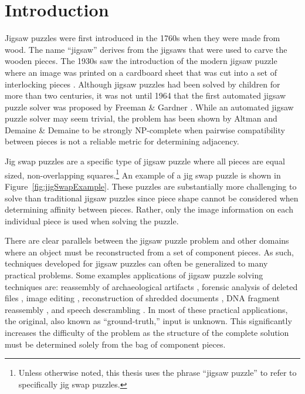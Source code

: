 \chapter{Introduction}\label{sec:introduction}

Jigsaw puzzles were first introduced in the 1760s when they were made from wood.  The name ``jigsaw'' derives from the jigsaws that were used to carve the wooden pieces.   The 1930s saw the introduction of the modern jigsaw puzzle where an image was printed on a cardboard sheet that was cut into a set of interlocking pieces \cite{williams1990, williams2004}.  Although jigsaw puzzles had been solved by children for more than two centuries, it was not until 1964 that the first automated jigsaw puzzle solver was proposed by Freeman \& Gardner \cite{freeman1964}.  While an automated jigsaw puzzle solver may seem trivial, the problem has been shown by Altman \cite{altman1990} and Demaine \& Demaine \cite{demaine2007} to be strongly NP-complete when pairwise compatibility between pieces is not a reliable metric for determining adjacency.

Jig swap puzzles are a specific type of jigsaw puzzle where all pieces are equal sized, non-overlapping squares.\footnote{Unless otherwise noted, this thesis uses the phrase ``jigsaw puzzle'' to refer to specifically jig swap puzzles.}  An example of a jig swap puzzle is shown in Figure~\ref{fig:jigSwapExample}.  These puzzles are substantially more challenging to solve than traditional jigsaw puzzles since piece shape cannot be considered when determining affinity between pieces.  Rather, only the image information on each individual piece is used when solving the puzzle.

There are clear parallels between the jigsaw puzzle problem and other domains where an object must be reconstructed from a set of component pieces.  As such, techniques developed for jigsaw puzzles can often be generalized to many practical problems.  Some examples applications of jigsaw puzzle solving techniques are: reassembly of archaeological artifacts \cite{brown2008, koller2006}, forensic analysis of deleted files \cite{garfinkel2010}, image editing \cite{cho2008}, reconstruction of shredded documents \cite{zhu2008}, DNA fragment reassembly \cite{marande2007}, and speech descrambling \cite{zhao2007}.  In most of these practical applications, the original, also known as ``ground-truth,'' input is unknown.  This significantly increases the difficulty of the problem as the structure of the complete solution must be determined solely from the bag of component pieces.

